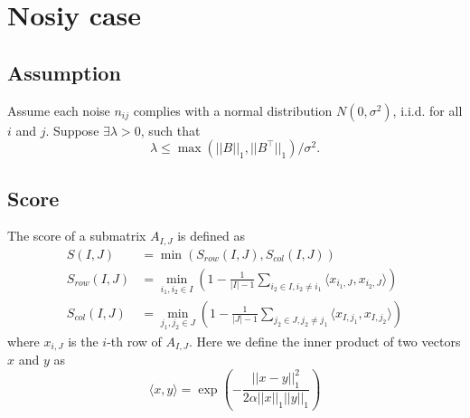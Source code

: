\documentclass[12pt]{article}
\begin{document}
\section{Nosiy case}
\subsection{Assumption}
Assume each noise $n_{ij}$ complies with a normal distribution $N(0, \sigma^2)$, i.i.d. for all $i$ and $j$. Suppose $\exists \lambda > 0$, such that
$$\lambda \le \max(||B||_1, ||B^\top||_1)/\sigma^2.$$

\subsection{Score}
The score of a submatrix $A_{I,J}$ is defined as
\begin{align}
    S(I,J)       & = \min(S_{row}(I,J), S_{col}(I,J))                                                                                          \\
    S_{row}(I,J) & = \min_{i_1, i_2 \in I} \left(1- \frac{1}{|I|-1} \sum_{i_2 \in I, i_2 \neq i_1} \langle x_{i_1,J}, x_{i_2,J}\rangle \right) \\
    S_{col}(I,J) & = \min_{j_1, j_2 \in J} \left(1- \frac{1}{|J|-1} \sum_{j_2 \in J, j_2 \neq j_1} \langle x_{I,j_1}, x_{I,j_2}\rangle \right)
\end{align}
where $x_{i,J}$ is the $i$-th row of $A_{I,J}$. Here we define the inner product of two vectors $x$ and $y$ as
$$\langle x, y \rangle = \exp(-\frac{||x - y||_1^2}{2\alpha||x||_1||y||_1})$$
\end{document}
